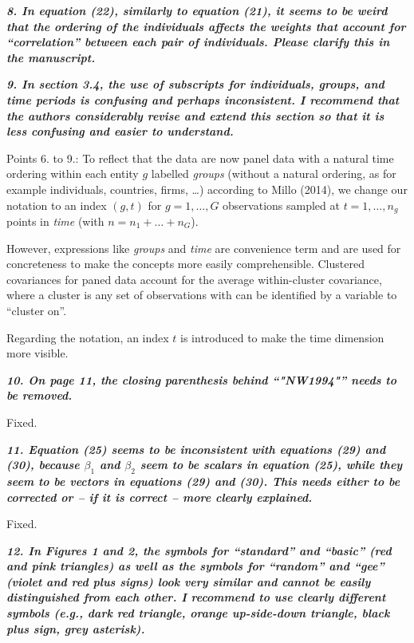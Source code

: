 \documentclass[10pt,a4paper]{article}
\begin{document}
\medskip

\textbf{\textit{8. In equation (22), similarly to equation (21), it seems to be weird that the ordering of
the individuals affects the weights that account for ``correlation'' between each pair of
individuals. Please clarify this in the manuscript.}}

\medskip

\textbf{\textit{9. In section 3.4, the use of subscripts for individuals, groups, and time periods is confusing
and perhaps inconsistent. I recommend that the authors considerably revise and extend
this section so that it is less confusing and easier to understand.}}

\medskip

 Points 6. to 9.: To reflect that the data are now panel data with a natural time ordering within each entity $g$ labelled \emph{groups} (without a natural ordering, as for example individuals, countries, firms, \ldots) according to Millo (2014), we change our notation
to an index $(g, t)$ for $g = 1, \dots, G$ observations sampled at $t = 1, \ldots, n_g$ points in \emph{time} (with $n = n_1 + \dots + n_G$).

However, expressions like \emph{groups} and \emph{time} are convenience term and are used for concreteness to make the concepts more easily comprehensible. Clustered covariances for paned data account for the average within-cluster covariance, where a cluster is any set of observations with can be identified by a variable to ``cluster on''. 

Regarding the notation, an index $t$ is introduced to make the time dimension more visible.

\medskip

\textbf{\textit{10. On page 11, the closing parenthesis behind ``"NW1994"'' needs to be removed.}}

\medskip

Fixed.

\medskip

\textbf{\textit{11. Equation (25) seems to be inconsistent with equations (29) and (30), because $\beta_1$ and
$\beta_2$ seem to be scalars in equation (25), while they seem to be vectors in equations (29)
and (30). This needs either to be corrected or -- if it is correct -- more clearly explained.}}

\medskip

Fixed.

\medskip

\textbf{\textit{12. In Figures 1 and 2, the symbols for ``standard'' and ``basic'' (red and pink triangles)
as well as the symbols for ``random'' and ``gee'' (violet and red plus signs) look very
similar and cannot be easily distinguished from each other. I recommend to use clearly
different symbols (e.g., dark red triangle, orange up-side-down triangle, black plus sign,
grey asterisk).}}
\end{document}

